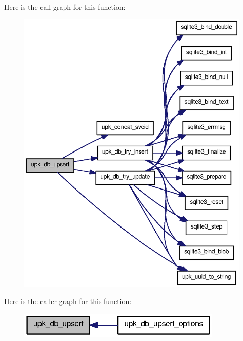 Here is the call graph for this function:
\nopagebreak
\begin{figure}[H]
\begin{center}
\leavevmode
\includegraphics[width=398pt]{group__controller_gafa2642c4954efe2d168a80703fa45c39_cgraph}
\end{center}
\end{figure}




Here is the caller graph for this function:
\nopagebreak
\begin{figure}[H]
\begin{center}
\leavevmode
\includegraphics[width=278pt]{group__controller_gafa2642c4954efe2d168a80703fa45c39_icgraph}
\end{center}
\end{figure}


